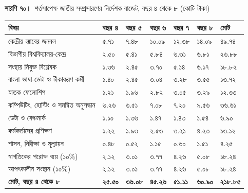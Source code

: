 \documentclass[border=10pt]{standalone}
\begin{document}
\begin{minipage}{22cm}
{\large\bfseries সারণি ৭০।}\ {\large শর্তসাপেক্ষ জাতীয় সম্প্রসারণের নির্দেশক বাজেট, বছর ৪ থেকে ৮ (কোটি টাকা)}\par\vspace{7pt}
\small
{}
\begin{tabularx}{\linewidth}{@{}>{\hsize=2.674\hsize\raggedright\arraybackslash}X>{\hsize=0.708\hsize\raggedright\arraybackslash}X>{\hsize=0.708\hsize\raggedright\arraybackslash}X>{\hsize=0.708\hsize\raggedright\arraybackslash}X>{\hsize=0.708\hsize\raggedright\arraybackslash}X>{\hsize=0.708\hsize\raggedright\arraybackslash}X>{\hsize=0.787\hsize\raggedright\arraybackslash}X@{}}
\arrayrulecolor{bapilrule}\toprule
\rowcolor{white}\textbf{বিষয়} & \textbf{বছর ৪} & \textbf{বছর ৫} & \textbf{বছর ৬} & \textbf{বছর ৭} & \textbf{বছর ৮} & \textbf{মোট} \\
\midrule
কেন্দ্রীয় ল্যাবের জনবল & ৫.৭১ & ৭.৪৮ & ১০.০৯ & ১২.৩৮ & ১৪.০৯ & ৪৯.৭৪ \\
বিভাগীয় বিশ্ববিদ্যালয়-কেন্দ্র & ২.৫০ & ৫.৪১ & ৫.৮৪ & ৬.৩১ & ৬.৮১ & ২৬.৮৮ \\
সংস্থায় নিযুক্ত বিশ্লেষক & ১.৩৬ & ২.৪৫ & ৩.৭০ & ৫.১৪ & ৬.১৭ & ১৮.৮২ \\
বাংলা ভাষা-ডেটা ও টীকাকরণ কর্মী & ১.৪০ & ২.৪৫ & ৩.০৪ & ৩.২৮ & ৩.৫৫ & ১৩.৭২ \\
স্নাতক ফেলোশিপ & ১.২১ & ১.৯৬ & ২.৮২ & ৩.০৫ & ৩.২৯ & ১২.৩৩ \\
কম্পিউটিং, হোস্টিং ও সমন্বিত অনুসন্ধান & ৬.২৬ & ৬.৫১ & ৭.০৮ & ৭.২০ & ৯.৫৬ & ৩৬.৬১ \\
ডেটা ও বেঞ্চমার্ক & ১.১০ & ১.৩৬ & ১.৪৭ & ১.৪৩ & ১.৫৪ & ৬.৯০ \\
কর্মকর্তাদের প্রশিক্ষণ & ১.২২ & ১.৯৩ & ২.৫৩ & ৩.২১ & ৪.২৩ & ১৩.১২ \\
শাসন, নিরীক্ষা ও মূল্যায়ন & ০.৪৮ & ০.৫২ & ১.১৫ & ০.৬০ & ১.৫১ & ৪.২৫ \\
স্বাগতিকের পরোক্ষ ব্যয় (১০\%) & ২.১২ & ৩.০১ & ৩.৭৭ & ৪.২৬ & ৫.০৮ & ১৮.২৪ \\
আপৎকালীন সংস্থান (১০\%) & ২.১২ & ৩.০১ & ৩.৭৭ & ৪.২৬ & ৫.০৮ & ১৮.২৪ \\
\textbf{মোট, বছর ৪ থেকে ৮} & \textbf{২৫.৫০} & \textbf{৩৬.০৮} & \textbf{৪৫.২৬} & \textbf{৫১.১১} & \textbf{৬০.৯০} & \textbf{২১৮.৮৫} \\
\bottomrule
\end{tabularx}
\par{}
\par{}
\end{minipage}
\end{document}
